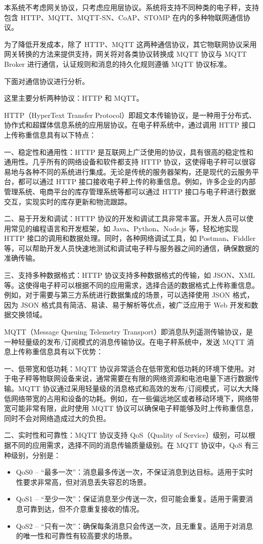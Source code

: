 \documentclass{xduugmr}
\begin{document}
本系统不考虑网关协议，只考虑应用层协议。系统将支持不同种类的电子秤，支持包含 HTTP、MQTT、MQTT-SN、CoAP、STOMP 在内的多种物联网通信协议。

为了降低开发成本，除了 HTTP、MQTT 这两种通信协议，其它物联网协议采用网关转换的方法来提供支持，网关将对各类协议转换成 MQTT 协议与 MQTT Broker 进行通信，认证规则和消息的持久化规则遵循 MQTT 协议标准。

下面对通信协议进行分析。

这里主要分析两种协议：HTTP 和 MQTT。

HTTP（HyperText Transfer Protocol）即超文本传输协议，是一种用于分布式、协作式和超媒体信息系统的应用层协议。在电子秤系统中，通过调用 HTTP 接口上传称重信息具有以下特点：

一、稳定性和通用性：HTTP 是互联网上广泛使用的协议，具有很高的稳定性和通用性。几乎所有的网络设备和软件都支持 HTTP 协议，这使得电子秤可以很容易地与各种不同的系统进行集成。无论是传统的服务器架构，还是现代的云服务平台，都可以通过 HTTP 接口接收电子秤上传的称重信息。例如，许多企业的内部管理系统、电商平台的库存管理系统等都可以通过 HTTP 接口与电子秤进行数据交互，实现实时的库存更新和物流跟踪\cite{Zhao2016}。

二、易于开发和调试：HTTP 协议的开发和调试工具非常丰富。开发人员可以使用常见的编程语言和开发框架，如 Java、Python、Node.js 等，轻松地实现 HTTP 接口的调用和数据处理。同时，各种网络调试工具，如 Postman、Fiddler 等，可以帮助开发人员快速地测试和调试电子秤与服务器之间的通信，确保数据的准确传输。

三、支持多种数据格式：HTTP 协议支持多种数据格式的传输，如 JSON、XML 等。这使得电子秤可以根据不同的应用需求，选择合适的数据格式上传称重信息。例如，对于需要与第三方系统进行数据集成的场景，可以选择使用 JSON 格式，因为 JSON 格式具有简洁、易读、易于解析等优点，被广泛应用于 Web 开发和数据交换领域。

MQTT（Message Queuing Telemetry Transport）即消息队列遥测传输协议，是一种轻量级的发布/订阅模式的消息传输协议。在电子秤系统中，发送 MQTT 消息上传称重信息具有以下优势：

一、低带宽和低功耗：MQTT 协议非常适合在低带宽和低功耗的环境下使用。对于电子秤等物联网设备来说，通常需要在有限的网络资源和电池电量下进行数据传输。MQTT 协议通过采用轻量级的消息格式和高效的发布/订阅模式，可以大大降低网络带宽的占用和设备的功耗。例如，在一些偏远地区或者移动环境下，网络带宽可能非常有限，此时使用 MQTT 协议可以确保电子秤能够及时上传称重信息，同时不会对网络造成过大的负担\cite{Jia2015}。

二、实时性和可靠性：MQTT 协议支持 QoS（Quality of Service）级别，可以根据不同的应用需求，选择不同的消息传输质量级别。在 MQTT 协议中，QoS 有三种级别\cite{Jia2015}，分别是：
\begin{itemize}
    \item QoS0 – “最多一次”：消息最多传送一次，不保证消息到达目标。适用于实时性要求非常高，但对消息丢失容忍的场景。
    \item QoS1 – “至少一次”：保证消息至少传送一次，但可能会重复。适用于需要消息可靠到达，但不介意重复接收的情况。
    \item QoS2 – “只有一次”：确保每条消息只会传送一次，且无重复。适用于对消息的唯一性和可靠性有较高要求的场景。
\end{itemize}
\end{document}
